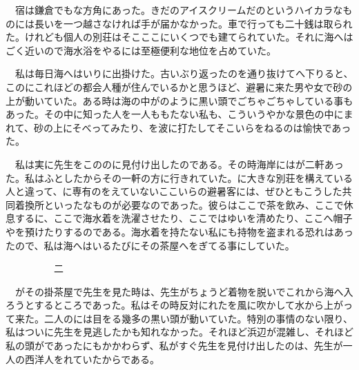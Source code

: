 \documentclass[a4j,onecolumn]{tarticle}
\begin{document}
　宿は鎌倉でもな方角にあった。\hbox{}きだのアイスクリームだのというハイカラなものには長いを一つ越さなければ手が届かなかった。\hbox{}車で行っても二十銭は取られた。\hbox{}けれども個人の別荘はそこここにいくつでも建てられていた。\hbox{}それに海へはごく近いので海水浴をやるには至極便利な地位を占めていた。\hbox{}\par{}
　私は毎日海へはいりに出掛けた。\hbox{}古いぶり返ったのを通り抜けてへ下りると、\hbox{}このにこれほどの都会人種が住んでいるかと思うほど、\hbox{}避暑に来た男や女で砂の上が動いていた。\hbox{}ある時は海の中がのように黒い頭でごちゃごちゃしている事もあった。\hbox{}その中に知った人を一人ももたない私も、\hbox{}こういうやかな景色の中にまれて、\hbox{}砂の上にそべってみたり、\hbox{}を波に打たしてそこいらをねるのは愉快であった。\hbox{}\par{}
　私は実に先生をこののに見付け出したのである。\hbox{}その時海岸にはが二軒あった。\hbox{}私はふとしたからその一軒の方に行きれていた。\hbox{}に大きな別荘を構えている人と違って、\hbox{}に専有のをえていないここいらの避暑客には、\hbox{}ぜひともこうした共同着換所といったなものが必要なのであった。\hbox{}彼らはここで茶を飲み、\hbox{}ここで休息するに、\hbox{}ここで海水着を洗濯させたり、\hbox{}ここではゆいを清めたり、\hbox{}ここへ帽子やを預けたりするのである。\hbox{}海水着を持たない私にも持物を盗まれる恐れはあったので、\hbox{}私は海へはいるたびにその茶屋へをぎてる事にしていた。\hbox{}\par{}\par{}　　　　　二
\par{}
　がその掛茶屋で先生を見た時は、\hbox{}先生がちょうど着物を脱いでこれから海へ入ろうとするところであった。\hbox{}私はその時反対にれたを風に吹かして水から上がって来た。\hbox{}二人のには目をる幾多の黒い頭が動いていた。\hbox{}特別の事情のない限り、\hbox{}私はついに先生を見逃したかも知れなかった。\hbox{}それほど浜辺が混雑し、\hbox{}それほど私の頭がであったにもかかわらず、\hbox{}私がすぐ先生を見付け出したのは、\hbox{}先生が一人の西洋人をれていたからである。\hbox{}\par{}
\end{document}
